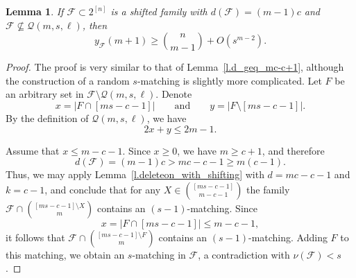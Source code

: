 \documentclass[12pt,a4paper]{article}
\newtheorem{lemma}{Lemma}
\newcommand{\m}{\mathcal}
\begin{document}
\begin{lemma} \label{l.stability_d_eq_mc-c}
    If $\mathcal{F} \subset 2^{[n]}$ is a shifted family with $d(\mathcal{F}) = (m-1)c$ and $\mathcal{F} \nsubseteq \mathcal{Q}(m,s,\ell)$, then
    \[
    y_{\mathcal{F}}(m+1) \geq {n \choose m - 1} + O(s^{m-2}).
    \]
\end{lemma}

\begin{proof}
    The proof is very similar to that of Lemma~\ref{l.d_geq_mc-c+1}, although the construction of a random $s$-matching is slightly more complicated. Let $F$ be an arbitrary set in $\mathcal{F} \setminus \mathcal{Q}(m, s, \ell)$. Denote
    \[
    x = |F \cap [ms-c-1]| \qquad \text{and} \qquad y = |F \setminus [ms-c-1]|.
    \]
    By the definition of $\mathcal{Q}(m, s, \ell)$, we have \begin{equation}\label{eqxy}2x + y \leq 2m - 1.\end{equation}

    Assume that $x \leq m-c-1$. Since $x \geq 0$, we have $m \geq c + 1$, and therefore
    \[
    d(\mathcal{F}) = (m-1)c > mc-c - 1 \geq m(c-1).
    \]
    Thus, we may apply Lemma~\ref{l.deleteon_with_shifting} with $d = mc-c-1$ and $k=c-1$, and conclude that for any
    $
    X \in {[ms-c-1] \choose m-c-1}
    $
    the family $\mathcal{F}\cap {[ms-c-1]\setminus X \choose m}$ contains an $(s-1)$-matching. Since
    \[
    x = |F \cap [ms-c-1]| \leq m - c - 1,
    \]
    it follows that $\mathcal{F}\cap {[ms-c-1]\setminus F \choose m}$ contains an $(s-1)$-matching. Adding $F$ to this matching, we obtain an $s$-matching in $\mathcal{F}$, a contradiction with $\nu(\m F)<s$.


\end{proof}
\end{document}
